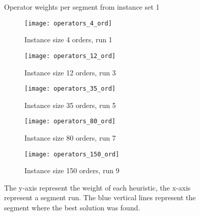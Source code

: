 \documentclass[../main.tex]{subfiles}
\begin{document}
\begin{figure}
    \centering
    \caption{Operator weights per segment from instance set 1}
    \begin{subfigure}[b]{0.45\textwidth}
        \centering
        \texttt{[image: operators\_4\_ord]}
        \caption{Instance size 4 orders, run 1}
        \label{fig:operators4}
    \end{subfigure}
    \hfill
    \begin{subfigure}[b]{0.45\textwidth}
        \centering
        \texttt{[image: operators\_12\_ord]}
        \caption{Instance size 12 orders, run 3}
        \label{fig:operators12}
    \end{subfigure}

    \begin{subfigure}[b]{0.45\textwidth}
        \centering
        \texttt{[image: operators\_35\_ord]}
        \caption{Instance size 35 orders, run 5}
        \label{fig:operators35}
    \end{subfigure}
    \hfill
    \begin{subfigure}[b]{0.45\textwidth}
        \centering
        \texttt{[image: operators\_80\_ord]}
        \caption{Instance size 80 orders, run 7}
        \label{fig:operators80}
    \end{subfigure}

    \begin{subfigure}[b]{0.45\textwidth}
        \centering
        \texttt{[image: operators\_150\_ord]}
        \caption{Instance size 150 orders, run 9}
        \label{fig:operators150}
    \end{subfigure}
    \label{fig:heuristics}
    \caption*{The y-axis represent the weight of each heuristic, the x-axis represent a segment run. The blue vertical lines represent the segment where the best solution was found.}
\end{figure}
\end{document}
